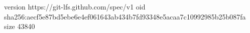 version https://git-lfs.github.com/spec/v1
oid sha256:aecf5e87bd5ebe6e4ef061643ab434b7fd93348e5acaa7c10992985b25b087fa
size 43840

